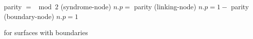 \begin{algorithm}[htbp]
  \BlankLine
  parity $=$  $\bmod 2$\;
  (syndrome-node){
      $n.p =$ parity}
  (linking-node){
      $n.p= 1-$ parity}
  (boundary-node){
    $n.p= 1$}
  \caption{ for surfaces with boundaries}\label{algo:calcparitybound}
\end{algorithm}

